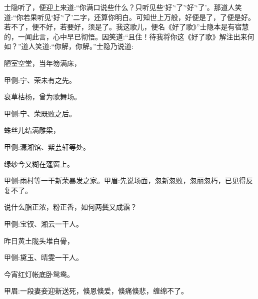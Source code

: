 \begin{parag}
    士隐听了，便迎上来道:“你满口说些什么？只听见些‘好’‘了’‘好’‘了’。那道人笑道:“你若果听见‘好’‘了’二字，还算你明白。可知世上万般，好便是了，了便是好。若不了，便不好，若要好，须是了。我这歌儿，便名《好了歌》”士隐本是有宿慧的，一闻此言，心中早已彻悟。因笑道:“且住！待我将你这《好了歌》解注出来何如？”道人笑道:“你解，你解。”士隐乃说道:
\end{parag}


\begin{poem}
    \begin{pl}陋室空堂，当年笏满床，\end{pl}\begin{note}甲侧:宁、荣未有之先。\end{note}

    \begin{pl}衰草枯杨，曾为歌舞场。\end{pl}\begin{note}甲侧:宁、荣既败之后。\end{note}

    \begin{pl}蛛丝儿结满雕梁，\end{pl}\begin{note}甲侧:潇湘馆、紫芸轩等处。\end{note}

    \begin{pl}绿纱今又糊在蓬窗上。\end{pl}\begin{note}甲侧:雨村等一干新荣暴发之家。甲眉:先说场面，忽新忽败，忽丽忽朽，已见得反复不了。\end{note}

    \begin{pl}说什么脂正浓，粉正香，如何两鬓又成霜？\end{pl}\begin{note}甲侧:宝钗、湘云一干人。\end{note}

    \begin{pl}昨日黄土陇头堆白骨，\end{pl}\begin{note}甲侧:黛玉、晴雯一干人。\end{note}

    \begin{pl}今宵红灯帐底卧鸳鸯。\end{pl}\begin{note}甲眉:一段妻妾迎新送死，倏恩倏爱，倏痛倏悲，缠绵不了。\end{note}


\end{poem}
